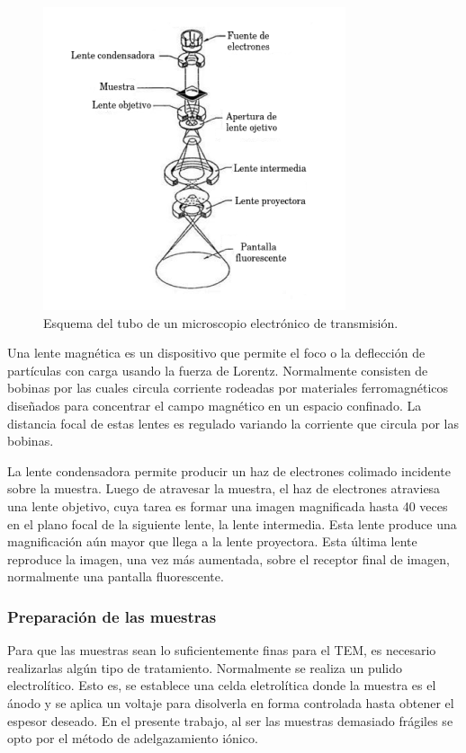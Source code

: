 \documentclass{article}
\theoremstyle{definition}
\theoremstyle{remark}
\begin{document}
 \begin{figure}[H]
 	\centering
	\includegraphics[scale=0.5]{img/TEM.png}
 	\caption{Esquema del tubo de un microscopio electrónico de transmisión.}
	\label{TEM}
\end{figure} 

Una lente magnética es un dispositivo que permite el foco o la deflección de partículas con carga usando la fuerza de Lorentz. Normalmente consisten de bobinas por las cuales circula corriente rodeadas por materiales ferromagnéticos diseñados para concentrar el campo magnético en un espacio confinado. La distancia focal de estas lentes es regulado variando la corriente que circula por las bobinas.

La lente condensadora permite producir un haz de electrones colimado incidente sobre la muestra. Luego de atravesar la muestra, el haz de electrones atraviesa una lente objetivo, cuya tarea es formar una imagen magnificada hasta 40 veces en el plano focal de la siguiente lente, la lente intermedia. Esta lente produce una magnificación aún mayor que llega a la lente proyectora. Esta última lente reproduce la imagen, una vez más aumentada, sobre el receptor final de imagen, normalmente una pantalla fluorescente.

\subsubsection{Preparación de las muestras}

Para que las muestras sean lo suficientemente finas para el TEM, es necesario realizarlas algún tipo de tratamiento. Normalmente se realiza un pulido electrolítico. Esto es, se establece una celda eletrolítica donde la muestra es el ánodo y se aplica un voltaje para disolverla en forma controlada hasta obtener el espesor deseado. En el presente trabajo, al ser las muestras demasiado frágiles se opto por el método de adelgazamiento iónico. 
\end{document}

